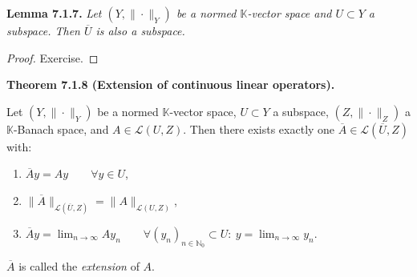 \documentclass[12pt]{article}
\newenvironment{satz}[1]{%
  \par\vspace{6pt}\noindent\textbf{Theorem #1.}\itshape\space
}{%
  \par\vspace{6pt}
}
\begin{document}
\par\vspace{6pt}\noindent\textbf{Lemma 7.1.7.}\itshape\space
Let $(Y,\|\cdot\|_Y)$ be a normed $\mathbb K$-vector space and $U\subset Y$ a subspace.
Then $\overline{U}$ is also a subspace.
\upshape

\begin{proof}
Exercise.
\end{proof}

\begin{satz}{7.1.8 (Extension of continuous linear operators)}
Let $(Y,\|\cdot\|_Y)$ be a normed $\mathbb K$-vector space, $U\subset Y$ a subspace,
$(Z,\|\cdot\|_Z)$ a $\mathbb K$-Banach space, and $A\in\mathcal L(U,Z)$.
Then there exists exactly one $\overline{A}\in\mathcal L(\overline{U},Z)$ with:
\begin{enumerate}
    \item $\overline{A}y=Ay\qquad\forall y\in U$,
    \item $\|\overline{A}\|_{\mathcal L(\overline{U},Z)}=\|A\|_{\mathcal L(U,Z)}$,
    \item $\overline{A}y=\lim_{n\to\infty}Ay_n\qquad\forall (y_n)_{n\in\mathbb N_0}\subset U:\ y=\lim_{n\to\infty}y_n$.
\end{enumerate}
$\overline{A}$ is called the \emph{extension} of $A$.
\end{satz}
\end{document}
